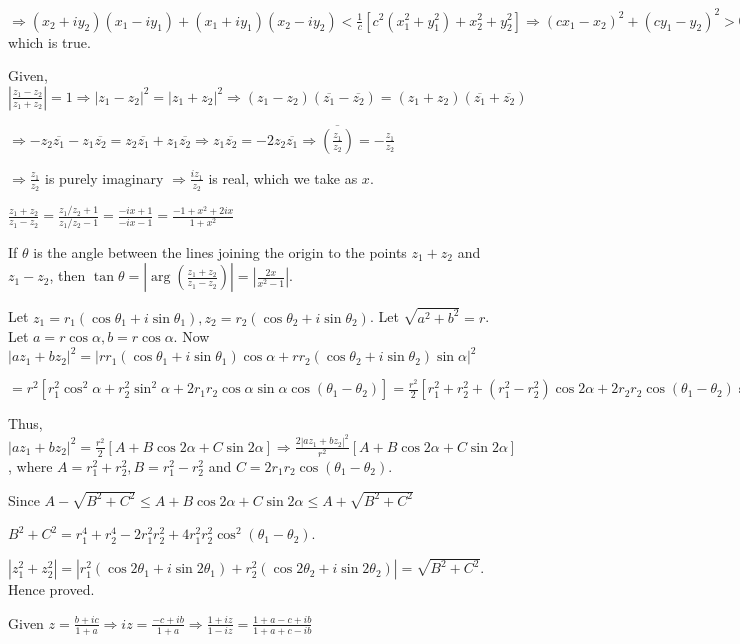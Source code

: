   $\Rightarrow (x_2 + iy_2)(x_1 - iy_1) + (x_1 + iy_1)(x_2 - iy_2) < \frac{1}{c}[c^2(x_1^2 + y_1^2) + x_2^2
    + y_2^2] \Rightarrow (cx_1 - x_2)^2 + (cy_1 - y_2)^2 > 0$ which is true.
\item Given, $\left|\frac{z_1 - z_2}{z_1 + z_2}\right| = 1\Rightarrow |z_1 - z_2|^2 = |z_1 + z_2|^2
  \Rightarrow (z_1 - z_2)(\overline{z_1} - \overline{z_2}) = (z_1 + z_2)(\overline{z_1} + \overline{z_2})$

  $\Rightarrow -z_2\overline{z_1} - z_1\overline{z_2} = z_2\overline{z_1} + z_1\overline{z_2} \Rightarrow
  z_1\overline{z_2} = -2z_2\overline{z_1} \Rightarrow \overline{\left(\frac{z_1}{z_2}\right)} =
  -\frac{z_1}{z_2}$

  $\Rightarrow \frac{z_1}{z_2}$ is purely imaginary $\Rightarrow \frac{iz_1}{z_2}$ is real, which we take as
  $x$.

  $\frac{z_1 + z_2}{z_1 - z_2} = \frac{z_1/z_2 + 1}{z_1/z_2 - 1} = \frac{-ix + 1}{-ix - 1} = \frac{-1 + x^2
    + 2ix}{1 + x^2}$

  If $\theta$ is the angle between the lines joining the origin to the points $z_1 + z_2$ and $z_1 - z_2$,
  then $\tan\theta = \left|\arg\left(\frac{z_1 + z_2}{z_1 - z_2}\right)\right| = \left|\frac{2x}{x^2 -
    1}\right|$.
\item Let $z_1 = r_1(\cos\theta_1 + i\sin\theta_1), z_2= r_2(\cos\theta_2 + i\sin\theta_2)$. Let $\sqrt{a^2
  + b^2} = r$. Let $a = r\cos\alpha, b = r\cos\alpha$. Now $|az_1 + bz_2|^2 = |rr_1(\cos\theta_1 +
  i\sin\theta_1)\cos\alpha + rr_2(\cos\theta_2 + i\sin\theta_2)\sin\alpha|^2$

  $= r^2[r_1^2\cos^2\alpha + r_2^2\sin^2\alpha + 2r_1r_2\cos\alpha\sin\alpha\cos(\theta_1 - \theta_2)] =
  \frac{r^2}{2}[r_1^2 + r_2^2 + (r_1^2 - r_2^2)\cos2\alpha + 2r_2r_2\cos(\theta_1 - \theta_2)\sin2\alpha]$

  Thus, $|az_1 + bz_2|^2 = \frac{r^2}{2}[A + B\cos2\alpha + C\sin2\alpha] \Rightarrow  \frac{2|az_1 +
    bz_2|^2}{r^2}[A + B\cos2\alpha + C\sin2\alpha]$, where $A = r_1^2 + r_2^2, B = r_1^2 - r_2^2$ and $C =
  2r_1r_2\cos(\theta_1 - \theta_2)$.

  Since $A - \sqrt{B^2 + C^2} \leq A + B\cos2\alpha +
  C\sin2\alpha \leq A + \sqrt{B^2 + C^2}$

  $B^2 + C^2 = r_1^4 + r_2^4 - 2r_1^2r_2^2 + 4r_1^2r_2^2\cos^2(\theta_1 - \theta_2)$.

  $|z_1^2 + z_2^2| = |r_1^2(\cos2\theta_1 + i\sin2\theta_1) + r_2^2(\cos2\theta_2 + i\sin2\theta_2)| =
  \sqrt{B^2 + C^2}$. Hence proved.
\item Given $z = \frac{b + ic}{1 + a} \Rightarrow iz = \frac{-c + ib}{1 + a} \Rightarrow \frac{1 + iz}{1 -
  iz} = \frac{1 + a - c + ib}{1 + a + c - ib}$

